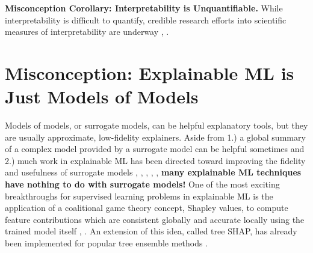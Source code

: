 \documentclass[fleqn]{article}
\begin{document}
\noindent \textbf{Misconception Corollary: Interpretability is Unquantifiable.} While interpretability is difficult to quantify, credible research efforts into scientific measures of interpretability are underway \cite{friedler2019assessing}, \cite{molnar2019quantifying}. 

\section{Misconception: Explainable ML is Just Models of Models}

Models of models, or surrogate models, can be helpful explanatory tools, but they are usually approximate, low-fidelity explainers. Aside from 1.) a global summary of a complex model provided by a surrogate model can be helpful sometimes and 2.) much work in explainable ML has been directed toward improving the fidelity and usefulness of surrogate models \cite{dt_surrogate1}, \cite{dt_surrogate2}, \cite{lime-sup}, \cite{wf_xnn}, \cite{viper}, \textbf{many explainable ML techniques have nothing to do with surrogate models!} One of the most exciting breakthroughs for supervised learning problems in explainable ML is the application of a coalitional game theory concept, Shapley values, to compute feature contributions which are consistent globally and accurate locally using the trained model itself \cite{kononenko2010efficient}, \cite{shapley}. An extension of this idea, called tree SHAP, has already been implemented for popular tree ensemble methods \cite{tree_shap}. 
\end{document}
